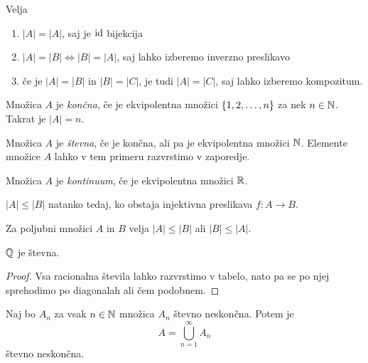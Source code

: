 \documentclass[12pt, a4paper]{article}
\begin{document}
\begin{opomba}
Velja

\begin{enumerate}[label=\roman*)]
\item $|A|=|A|$, saj je $\operatorname{id}$ bijekcija
\item $|A|=|B|\iff |B|=|A|$, saj lahko izberemo inverzno preslikavo
\item če je $|A|=|B|$ in $|B|=|C|$, je tudi $|A|=|C|$, saj lahko izberemo kompozitum.
\end{enumerate}
\end{opomba}

\begin{definicija}
Množica $A$ je \emph{končna}, če je ekvipolentna množici $\left\{1,2,\dots,n\right\}$ za nek $n\in\mathbb{N}$. Takrat je $|A|=n$.
\end{definicija}

\begin{definicija}
Množica $A$ je \emph{števna}, če je končna, ali pa je ekvipolentna množici $\mathbb{N}$. Elemente množice $A$ lahko v tem primeru razvrstimo v zaporedje.
\end{definicija}

\begin{definicija}
Množica $A$ je \emph{kontinuum}, če je ekvipolentna množici $\mathbb{R}$.
\end{definicija}

\begin{definicija}
$|A|\leq |B|$ natanko tedaj, ko obstaja injektivna preslikava $f\colon A\to B$.
\end{definicija}

\begin{opomba}
Za poljubni množici $A$ in $B$ velja $|A|\leq |B|$ ali $|B|\leq |A|$.
\end{opomba}

\begin{izrek}
$\mathbb{Q}$ je števna.
\end{izrek}

\begin{proof}
Vsa racionalna števila lahko razvrstimo v tabelo, nato pa se po njej sprehodimo po diagonalah ali čem podobnem.
\end{proof}

\begin{izrek}
Naj bo $A_n$ za vsak $n\in\mathbb{N}$ množica $A_n$ števno neskončna. Potem je
\[
A=\bigcup_{n=1}^\infty A_n
\]
števno neskončna.
\end{izrek}
\end{document}
